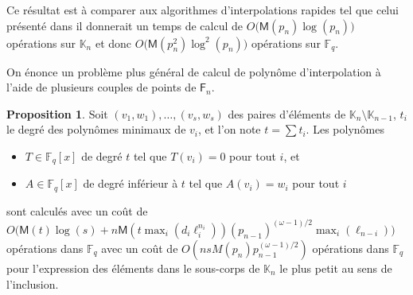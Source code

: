 \documentclass[10pt,a4paper]{book}
\theoremstyle{plain}
\theoremstyle{definition}
\theoremstyle{definition}
\theoremstyle{definition}
\newtheorem{prop}[thm]{Proposition}
\theoremstyle{definition}
\theoremstyle{remark}
\theoremstyle{remark}
\theoremstyle{definition}
\begin{document}
 
 Ce résultat est à comparer aux algorithmes d'interpolations rapides 
 tel que  celui présenté dans \cite[Chapter~10.2]{vzGJG03} il donnerait un temps
 de calcul de  $O\bigl(\mathsf{M}(p_n)\log(p_n)\bigr)$ opérations sur 
 $\mathbb{K}_n$ et donc $O\bigl(\mathsf{M}(p_n^2)\log^2(p_n)\bigr)$ opérations sur
 $\mathbb{F}_q$. 

On énonce un problème plus général de calcul de polynôme d'interpolation 
à l'aide de plusieurs couples de points de $\mathsf{F}_n$.

\begin{prop}
  Soit $(v_1,w_1),\dots,(v_s,w_s)$ des paires d'éléments de $\mathbb{K}_n 
  \setminus \mathbb{K}_{n-1}$, $t_i$ le degré des polynômes minimaux de $v_i$, 
  et l'on note  $t=\sum t_i$. 
  Les polynômes
  \begin{itemize}
  \item $T\in \mathbb{F}_q[x]$ de degré $t$ tel que $T(v_i)=0$ pour tout $i$,
    et
  \item $A\in \mathbb{F}_q[x]$ de degré inférieur à $t$ tel que $A(v_i)=w_i$ pour
    tout $i$
  \end{itemize}
  sont calculés avec un coût de
  $O\bigl(\mathsf{M}(t)\log(s) + n\mathsf{M}(t \max_i(d_i\ell_i^{n_i}))(p_{n-1})^{(\omega-1)/2} \max_{i}(\ell_{n-i})\bigr)$ 
  opérations dans $\mathbb{F}_q$ avec un coût de 
  $O(nsM(p_n)p_{n-1}^{(\omega-1)/2})$ opérations dans $\mathbb{F}_q$ pour 
  l'expression des éléments dans le sous-corps de $\mathbb{K}_n$ le plus petit 
  au sens de l'inclusion.
\end{prop}
\end{document}
